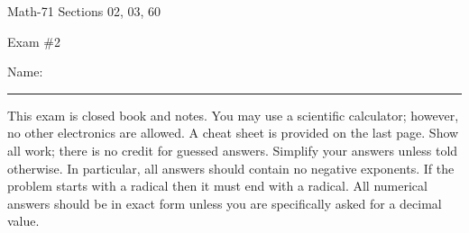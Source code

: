\documentclass[letterpaper,12pt,fleqn]{article}
\begin{document}
\begin{center}
  \large
  Math-71 Sections 02, 03, 60

  \Large
  Exam \#2
\end{center}

\vspace{0.5in}

Name: \rule{4in}{1pt}

\vspace{0.25in}

This exam is closed book and notes. You may use a scientific calculator; however, no other electronics are allowed.
A cheat sheet is provided on the last page.  Show all work; there is no credit for guessed answers.  Simplify your
answers unless told otherwise.  In particular, all answers should contain no negative exponents.  If the problem
starts with a radical then it must end with a radical.  All numerical answers should be in exact form unless you
are specifically asked for a decimal value.

\vspace{0.25in}
\end{document}
